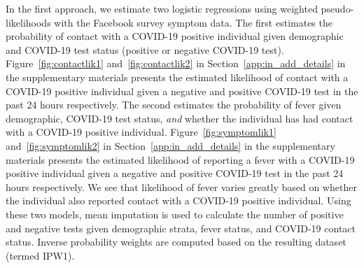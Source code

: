 \documentclass[11pt]{amsart}
\numberwithin{equation}{section}
\theoremstyle{plain}
\begin{document}
 In the first approach, we estimate two logistic regressions using weighted pseudo-likelihoods with the Facebook survey symptom data.  The first estimates the probability of contact with a COVID-19 positive individual given demographic and COVID-19 test status (positive or negative COVID-19 test). Figure~\ref{fig:contactlik1} and~\ref{fig:contactlik2} in Section~\ref{app:in_add_details} in the supplementary materials presents the estimated likelihood of contact with a COVID-19 positive individual given a negative and positive COVID-19 test in the past 24 hours respectively.  The second estimates the probability of fever given demographic, COVID-19 test status, \emph{and} whether the individual has had contact with a COVID-19 positive individual.  Figure~\ref{fig:symptomlik1} and~\ref{fig:symptomlik2} in Section~\ref{app:in_add_details} in the supplementary materials presents the estimated likelihood of reporting a fever with a COVID-19 positive individual given a negative and positive COVID-19 test in the past 24 hours respectively.  We see that likelihood of fever varies greatly based on whether the individual also reported contact with a COVID-19 positive individual. Using these two models, mean imputation is used to calculate the number of positive and negative tests given demographic strata, fever status, and COVID-19 contact status. Inverse probability weights are computed based on the resulting dataset (termed IPW1).
\end{document}
